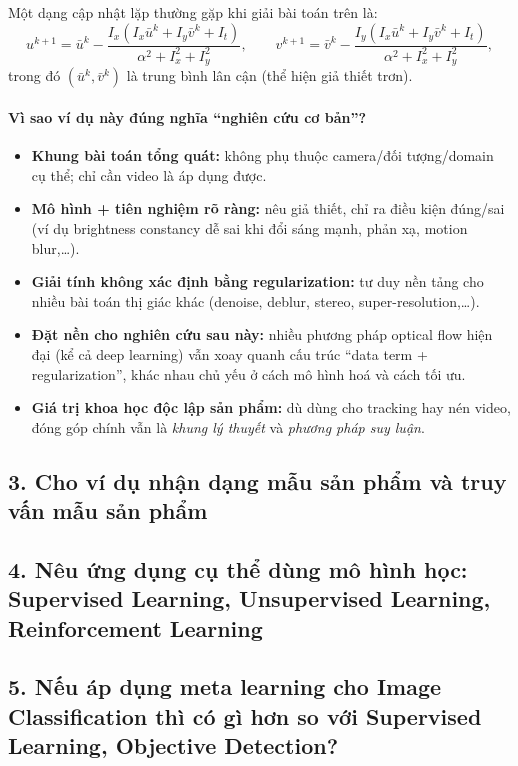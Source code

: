 Một dạng cập nhật lặp thường gặp khi giải bài toán trên là:
\[
u^{k+1}=\bar{u}^{k}-\frac{I_x\left(I_x\bar{u}^{k}+I_y\bar{v}^{k}+I_t\right)}{\alpha^2+I_x^2+I_y^2},
\qquad
v^{k+1}=\bar{v}^{k}-\frac{I_y\left(I_x\bar{u}^{k}+I_y\bar{v}^{k}+I_t\right)}{\alpha^2+I_x^2+I_y^2},
\]
trong đó $(\bar{u}^{k},\bar{v}^{k})$ là trung bình lân cận (thể hiện giả thiết trơn).

\paragraph{Vì sao ví dụ này đúng nghĩa ``nghiên cứu cơ bản''?}
\begin{itemize}
  \item \textbf{Khung bài toán tổng quát:} không phụ thuộc camera/đối tượng/domain cụ thể; chỉ cần video là áp dụng được.
  \item \textbf{Mô hình + tiên nghiệm rõ ràng:} nêu giả thiết, chỉ ra điều kiện đúng/sai (ví dụ brightness constancy dễ sai khi đổi sáng mạnh, phản xạ, motion blur,\ldots).
  \item \textbf{Giải tính không xác định bằng regularization:} tư duy nền tảng cho nhiều bài toán thị giác khác (denoise, deblur, stereo, super-resolution,\ldots).
  \item \textbf{Đặt nền cho nghiên cứu sau này:} nhiều phương pháp optical flow hiện đại (kể cả deep learning) vẫn xoay quanh cấu trúc ``data term + regularization'', khác nhau chủ yếu ở cách mô hình hoá và cách tối ưu.
  \item \textbf{Giá trị khoa học độc lập sản phẩm:} dù dùng cho tracking hay nén video, đóng góp chính vẫn là \emph{khung lý thuyết} và \emph{phương pháp suy luận}.
\end{itemize}

\subsection*{3. Cho ví dụ nhận dạng mẫu sản phẩm và truy vấn mẫu sản phẩm}

\subsection*{4. Nêu ứng dụng cụ thể dùng mô hình học: Supervised Learning, Unsupervised Learning, Reinforcement Learning}

\subsection*{5. Nếu áp dụng meta learning cho Image Classification thì có gì hơn so với Supervised Learning, Objective Detection?}